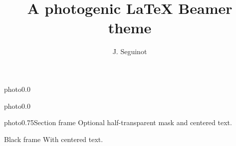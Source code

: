 \documentclass[aspectratio=1610]{beamer}
\title{A photogenic LaTeX Beamer theme}
\author[seguinot@vaw.baug.ethz.ch]{J. Seguinot}
\institute{ETH Zürich, Switzerland}
\begin{document}

    \begin{backgroundframe}[b]{photo}{0.0}{}
      \titlepage
    \end{backgroundframe}

    \begin{backgroundframe}[t]{photo}{0.0}{}
      \flushright{}
    \end{backgroundframe}

    \begin{sectionframe}{photo}{0.75}{Section frame}
      Optional half-transparent mask and centered text.
    \end{sectionframe}

    \begin{darkframe}{Black frame}
      With centered text.
    \end{darkframe}

\end{document}
